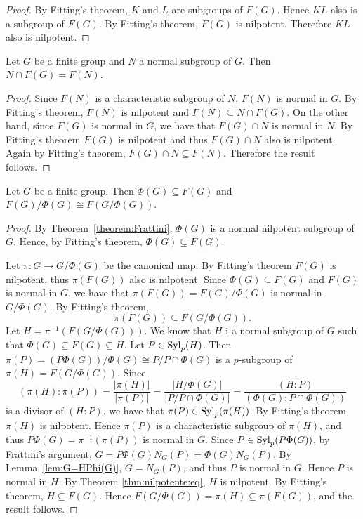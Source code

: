 \begin{proof}
	By Fitting's theorem, $K$ and $L$ are subgroups of $F(G)$. Hence $KL$ also is a subgroup of $F(G)$. By Fitting's theorem, 
	$F(G)$ is nilpotent. Therefore  $KL$ also is nilpotent.
\end{proof}

\begin{corollary}
	\label{corollary:McapF(G)}
	Let $G$ be a finite group and $N$ a normal subgroup of $G$. Then
	$N\cap F(G)=F(N)$.
\end{corollary}

\begin{proof}
	Since $F(N)$ is a characteristic subgroup of $N$, $F(N)$ is normal in $G$. By Fitting's theorem, $F(N)$ is nilpotent and
	$F(N)\subseteq N\cap F(G)$. 
	On the other hand, since 
	$F(G)$ is normal in $G$, we have that $F(G)\cap N$ is normal in $N$. By Fitting's theorem $F(G)$ is nilpotent and thus $F(G)\cap N$
	also is nilpotent. Again by Fitting's theorem, $F(G)\cap N\subseteq F(N)$. Therefore the result follows. 
\end{proof}


\begin{theorem}
	Let $G$ be a finite group. Then
    $\Phi(G)\subseteq F(G)$ and $F(G)/\Phi(G)\cong F(G/\Phi(G))$.
\end{theorem}

\begin{proof}
	By Theorem~\ref{theorem:Frattini}, $\Phi(G)$ is a normal nilpotent subgroup of $G$. Hence, by Fitting's theorem,
	$\Phi(G)\subseteq F(G)$.

    Let $\pi\colon G\to G/\Phi(G)$ be the canonical map. By Fitting's theorem $F(G)$ is nilpotent, thus $\pi(F(G))$ also is 
    nilpotent. Since $\Phi(G)\subseteq F(G)$ and $F(G)$ is normal in $G$, we have that $\pi(F(G))=F(G)/\Phi(G)$ 
    is normal in $G/\Phi(G)$. By Fitting's theorem,
	\[
	\pi(F(G))\subseteq F(G/\Phi(G)).
	\]
    Let	$H=\pi^{-1}(F(G/\Phi(G)))$. We know that $H$ i a normal  subgroup
	of $G$ such that $\Phi(G)\subseteq F(G)\subseteq H$. Let $P\in\mathrm{Syl}_p(H)$. Then
	$\pi(P)=(P\Phi(G))/\Phi(G)\cong P/P\cap \Phi(G)$ is a
	$p$-subgroup of $\pi(H)=F(G/\Phi(G))$. Since 
	\[
	(\pi(H):\pi(P))
	=\frac{|\pi(H)|}{|\pi(P)|}
	=\frac{|H/\Phi(G)|}{|P/P\cap \Phi(G)|}
	=\frac{(H:P)}{(\Phi(G):P\cap\Phi(G))}
	\]
	is a divisor of $(H:P)$, we have that $\pi(P)\in \mathrm{Syl}_p(\pi(H))$. By Fitting's theorem $\pi(H)$ is nilpotent.
	Hence $\pi(P)$ is a characteristic subgroup of $\pi(H)$, and thus  $P\Phi(G)=\pi^{-1}(\pi(P))$ is
	normal in $G$. Since $P\in\mathrm{Syl}_p(P\Phi(G))$, by Frattini's argument, $G=P\Phi(G)N_G(P)=\Phi(G)N_G(P)$. By Lemma~\ref{lem:G=HPhi(G)}, $G=N_G(P)$, and thus $P$ is normal in $G$. Hence $P$ is normal in $H$. By Theorem \ref{thm:nilpotente:eq}, $H$ is nilpotent. By Fitting's theorem, $H\subseteq F(G)$. Hence
	$F(G/\Phi(G))=\pi(H)\subseteq \pi(F(G))$, and the result follows.
\end{proof}

